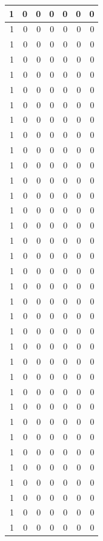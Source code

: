 \documentclass[
  12pt,
]{krantz}
\begin{document}
\begin{tabular}{r|r|r|r|r|r|r}
\hline
1 & 0 & 0 & 0 & 0 & 0 & 0\\
\hline
1 & 0 & 0 & 0 & 0 & 0 & 0\\
\hline
1 & 0 & 0 & 0 & 0 & 0 & 0\\
\hline
1 & 0 & 0 & 0 & 0 & 0 & 0\\
\hline
1 & 0 & 0 & 0 & 0 & 0 & 0\\
\hline
1 & 0 & 0 & 0 & 0 & 0 & 0\\
\hline
1 & 0 & 0 & 0 & 0 & 0 & 0\\
\hline
1 & 0 & 0 & 0 & 0 & 0 & 0\\
\hline
1 & 0 & 0 & 0 & 0 & 0 & 0\\
\hline
1 & 0 & 0 & 0 & 0 & 0 & 0\\
\hline
1 & 0 & 0 & 0 & 0 & 0 & 0\\
\hline
1 & 0 & 0 & 0 & 0 & 0 & 0\\
\hline
1 & 0 & 0 & 0 & 0 & 0 & 0\\
\hline
1 & 0 & 0 & 0 & 0 & 0 & 0\\
\hline
1 & 0 & 0 & 0 & 0 & 0 & 0\\
\hline
1 & 0 & 0 & 0 & 0 & 0 & 0\\
\hline
1 & 0 & 0 & 0 & 0 & 0 & 0\\
\hline
1 & 0 & 0 & 0 & 0 & 0 & 0\\
\hline
1 & 0 & 0 & 0 & 0 & 0 & 0\\
\hline
1 & 0 & 0 & 0 & 0 & 0 & 0\\
\hline
1 & 0 & 0 & 0 & 0 & 0 & 0\\
\hline
1 & 0 & 0 & 0 & 0 & 0 & 0\\
\hline
1 & 0 & 0 & 0 & 0 & 0 & 0\\
\hline
1 & 0 & 0 & 0 & 0 & 0 & 0\\
\hline
1 & 0 & 0 & 0 & 0 & 0 & 0\\
\hline
1 & 0 & 0 & 0 & 0 & 0 & 0\\
\hline
1 & 0 & 0 & 0 & 0 & 0 & 0\\
\hline
1 & 0 & 0 & 0 & 0 & 0 & 0\\
\hline
1 & 0 & 0 & 0 & 0 & 0 & 0\\
\hline
1 & 0 & 0 & 0 & 0 & 0 & 0\\
\hline
1 & 0 & 0 & 0 & 0 & 0 & 0\\
\hline
1 & 0 & 0 & 0 & 0 & 0 & 0\\
\hline
1 & 0 & 0 & 0 & 0 & 0 & 0\\
\hline
1 & 0 & 0 & 0 & 0 & 0 & 0\\
\hline
1 & 0 & 0 & 0 & 0 & 0 & 0\\

\end{tabular}
\end{document}
